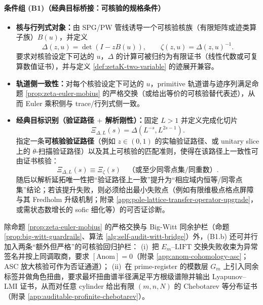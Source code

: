 \paragraph{条件组 (B1)（经典目标桥接：可核验的规格条件）}
\begin{itemize}
  \item[(B1.a)] \textbf{核与行列式对象：}由 SPG/PW 管线诱导一个可核验核族（有限矩阵或迹类算子族）$B(u)$，并定义
  $$
  \Delta(z,u)=\det(I-zB(u)),\qquad \zeta(z,u)=\Delta(z,u)^{-1}.
  $$
  要求对核验设定下可达的 $u$，$\Delta$ 的计算可被归约为有限证书（线性代数或可复算数值证书），并与定义 \ref{def:zetaK-two-variable} 的迹展开兼容。

  \item[(B1.b)] \textbf{轨道侧一致性：}对每个核验设定下可达的 $u$，primitive 轨道谱与迹序列满足命题 \ref{prop:zeta-euler-mobius} 的严格交换（或给出等价的可核验替代表述），从而 Euler 乘积侧与 trace/行列式侧一致。

  \item[(B1.c)] \textbf{经典目标识别（验证路径 $+$ 解析刚性）：}固定 $L>1$ 并定义完成化切片
  $$
  \Xi_{\Delta,L}(s)=\Delta(L^{-s},L^{2s-1}).
  $$
  指定一条\textbf{可核验验证路径}（例如 $z\in(0,1)$ 的实轴验证路径、或 unitary slice 上的 $\theta$-扫描验证路径）以及其上可核验的匹配准则，使得在该路径上一致性可由证书核验：
  $$
  \Xi_{\Delta,L}(s)\equiv \Xi_\zeta(s)\quad\text{（或至少同零点集/同重数）}.
  $$
  随后以解析延拓唯一性把“验证路径上一致”提升为“相应域内恒等/同零点集”结论；若该提升失败，则必须给出最小失败点（例如有限维极点格点屏障与其 Fredholm 升级机制；附录 \ref{app:pole-lattice-transfer-operator-upgrade}，或需状态数增长的 sofic 细化等）的可否证诊断。
\end{itemize}

\begin{remark}\label{rem:b1b-extra-guardrails}
除命题 \ref{prop:zeta-euler-mobius} 的严格交换与 Big-Witt 同余护栏（命题 \ref{prop:big-witt-guardrails}、算法 \ref{alg:self-audit-witt-bridge}）外，(B1.b) 还可并行加入两条“额外但严格”的可核验回归护栏：
(i)~把 $E_m$--$\mathrm{LIFT}$ 交换失败收束为异常签名并按上同调取商，要求 $[\mathrm{Anom}]=0$（附录 \ref{app:anom-cohomology-asc}；ASC 放大核验可作为否证通道）；
(ii)~在 prime-register 的模数层 $G_m$ 上引入同余标签并做角色扭曲，要求最坏扭曲谱半径满足平方根级谱隙并输出 Lyapunov--LMI 证书，从而对任意 cylinder 给出有限 $(m,n,N)$ 的 Chebotarev 等分布证书（附录 \ref{app:auditable-profinite-chebotarev}）。
\end{remark}

